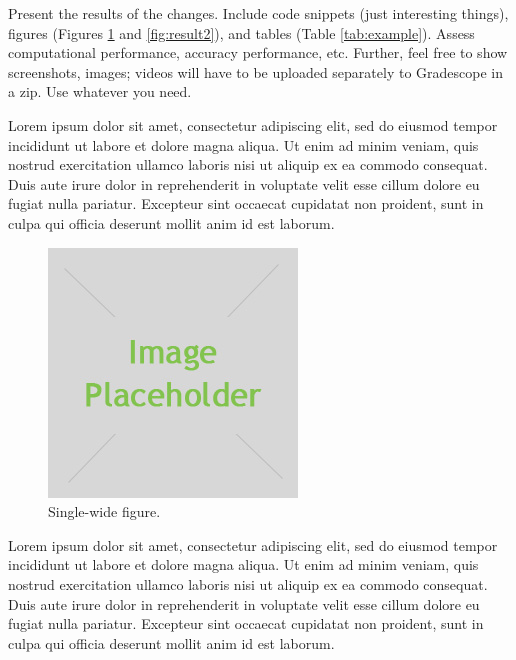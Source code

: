 Present the results of the changes. Include code snippets (just interesting things), figures (Figures \ref{fig:result1} and \ref{fig:result2}), and tables (Table \ref{tab:example}). Assess computational performance, accuracy performance, etc. Further, feel free to show screenshots, images; videos will have to be uploaded separately to Gradescope in a zip. Use whatever you need.


Lorem ipsum dolor sit amet, consectetur adipiscing elit, sed do eiusmod tempor incididunt ut labore et dolore magna aliqua. Ut enim ad minim veniam, quis nostrud exercitation ullamco laboris nisi ut aliquip ex ea commodo consequat. Duis aute irure dolor in reprehenderit in voluptate velit esse cillum dolore eu fugiat nulla pariatur. Excepteur sint occaecat cupidatat non proident, sunt in culpa qui officia deserunt mollit anim id est laborum.

\begin{figure}[t]
    \centering
    \includegraphics[width=\linewidth]{placeholder.jpg}
    \caption{Single-wide figure.}
    \label{fig:result1}
\end{figure}

Lorem ipsum dolor sit amet, consectetur adipiscing elit, sed do eiusmod tempor incididunt ut labore et dolore magna aliqua. Ut enim ad minim veniam, quis nostrud exercitation ullamco laboris nisi ut aliquip ex ea commodo consequat. Duis aute irure dolor in reprehenderit in voluptate velit esse cillum dolore eu fugiat nulla pariatur. Excepteur sint occaecat cupidatat non proident, sunt in culpa qui officia deserunt mollit anim id est laborum.


